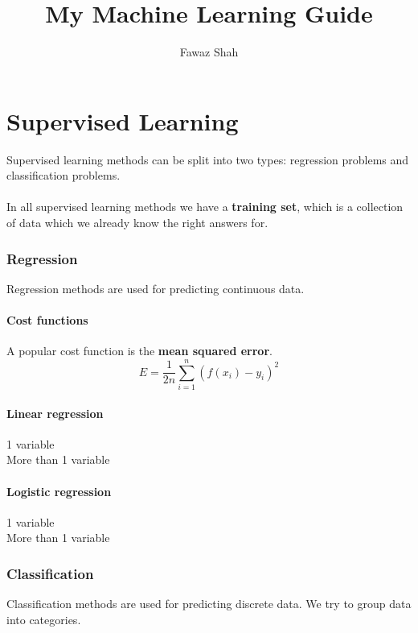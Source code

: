 \documentclass{scrartcl}
\title{My Machine Learning Guide}
\subtitle{}
\date{}
\author{Fawaz Shah}
\begin{document}
\large
\maketitle
\tableofcontents
\newpage

\part{Supervised Learning}

Supervised learning methods can be split into two types: regression problems and classification problems.
\\\\
In all supervised learning methods we have a \textbf{training set}, which is a collection of data which we already know the right answers for.

\section{Regression}

Regression methods are used for predicting continuous data.

\subsection{Cost functions}

A popular cost function is the \textbf{mean squared error}.
\begin{equation}
E = \frac{1}{2n} \sum^{n}_{i = 1} (f(x_{i}) - y_{i})^{2}
\end{equation}

\subsection{Linear regression}

1 variable\\
More than 1 variable

\subsection{Logistic regression}

1 variable\\
More than 1 variable

\section{Classification}

Classification methods are used for predicting discrete data. We try to 
group data into categories.
\end{document}
